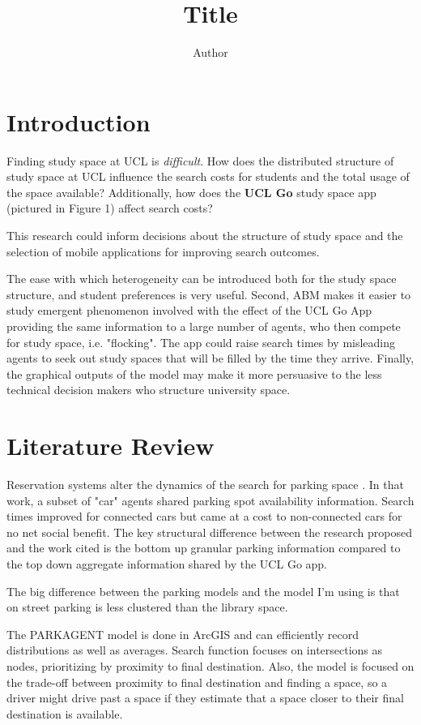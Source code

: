 \documentclass[11pt]{article} %
\title{\vspace{-3.0cm}Title}
\author{Author}
\begin{document}
\maketitle

\section{Introduction}

Finding study space at UCL is \textit{difficult}.  How does the distributed structure of study space at UCL influence the search costs for students and the total usage of the space available? Additionally, how does the \textbf{UCL Go} study space app (pictured in Figure 1) affect search costs? 

This research could inform decisions about the structure of study space and the selection of mobile applications for improving search outcomes.

The ease with which heterogeneity can be introduced both for the study space structure, and student preferences is very useful. Second, ABM makes it easier to study emergent phenomenon involved with the effect of the UCL Go App providing the same information to a large number of agents, who then compete for study space, i.e. "flocking". The app could raise search times by misleading agents to seek out study spaces that will be filled by the time they arrive.   Finally, the graphical outputs of the model may make it more persuasive to the less technical decision makers who structure university space.\\

\section{Literature Review}

Reservation systems alter the dynamics of the search for parking space \parencite{TasseronG.2017Upsr}. In that work, a subset of "car" agents shared parking spot availability information. Search times improved for connected cars but came at a cost to non-connected cars for no net social benefit. The key structural difference between the research proposed and the work cited is the bottom up granular parking information compared to the top down aggregate information shared by the UCL Go app.

The big difference between the parking models and the model I'm using is that on street parking is less clustered than the library space. 

The PARKAGENT model is done in ArcGIS and can efficiently record distributions as well as averages. Search function focuses on intersections as nodes, prioritizing by proximity to final destination. Also, the model is focused on the trade-off between proximity to final destination and finding a space, so a driver might drive past a space if they estimate that a space closer to their final destination is available. 
\end{document}

